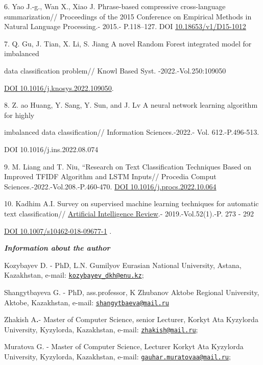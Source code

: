 \documentclass[
]{article}
\begin{document}
6. Yao J.-g., Wan X., Xiao J. Phrase-based compressive cross-language
summarization// Proceedings of the 2015 Conference on Empirical Methods
in Natural Language Processing.- 2015.- P.118--127. DOI
\href{http://dx.doi.org/10.18653/v1/D15-1012}{\ul{10.18653/v1/D15-1012}}

7. Q. Gu, J. Tian, X. Li, S. Jiang A novel Random Forest integrated
model for imbalanced

data classification problem// Knowl Based Syst. -2022.-Vol.250:109050

\href{https://doi.org/10.1016/j.knosys.2022.109050}{DOI
10.1016/j.knosys.2022.109050}.

8. Z. ao Huang, Y. Sang, Y. Sun, and J. Lv A neural network learning
algorithm for highly

imbalanced data classification// Information Sciences.-2022.- Vol.
612.-P.496-513.

DOI 10.1016/j.ins.2022.08.074

9. M. Liang and T. Niu, ``Research on Text Classification Techniques
Based on Improved TFIDF Algorithm and LSTM Inputs// Procedia Comput
Sciences.-2022.-Vol.208.-P.460-470.
\href{https://doi.org/10.1016/j.procs.2022.10.064}{DOI
10.1016/j.procs.2022.10.064}

10. Kadhim A.I. Survey on supervised machine learning techniques for
automatic text classification//
\href{https://www.researchgate.net/journal/Artificial-Intelligence-Review-1573-7462?_tp=eyJjb250ZXh0Ijp7ImZpcnN0UGFnZSI6InB1YmxpY2F0aW9uIiwicGFnZSI6InB1YmxpY2F0aW9uIn19}{Artificial
Intelligence Review}.- 2019.-Vol.52(1).-P. 273 - 292

\href{https://doi.org/10.1007/s10462-018-09677-1}{DOI
10.1007/s10462-018-09677-1} .

\emph{\textbf{Information about the author}}

Kozybayev D. - PhD, L.N. Gumilyov Eurasian National University, Astana,
Kazakhstan, e-mail:
\href{mailto:kozybayev_dkh@enu.kz}{\nolinkurl{kozybayev\_dkh@enu.kz}};

Shangytbayeva G. - PhD, ass.professor, K Zhubanov Aktobe Regional
University, Aktobe, Kazakhstan, e-mail:
\href{mailto:shangytbaeva@mail.ru}{\nolinkurl{shangytbaeva@mail.ru}}

Zhakish A\textbf{.}- Master of Computer Science, senior Lecturer, Korkyt
Ata Kyzylorda University, Kyzylorda, Kazakhstan, e-mail:
\href{mailto:zhakish@mail.ru}{\nolinkurl{zhakish@mail.ru}};

Muratova G. - Master of Computer Science, Lecturer Korkyt Ata Kyzylorda
University, Kyzylorda, Kazakhstan, e-mail:
\href{mailto:gauhar.muratovaa@mail.ru}{\nolinkurl{gauhar.muratovaa@mail.ru}};
\end{document}
